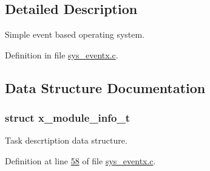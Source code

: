 \subsection{Detailed Description}
Simple event based operating system. 



Definition in file \hyperlink{a00037_source}{sys\+\_\+eventx.\+c}.



\subsection{Data Structure Documentation}
\label{dc/d0a/a00850}
\hypertarget{a00037_dc/d0a/a00850}{}
\subsubsection{struct x\+\_\+module\+\_\+info\+\_\+t}
Task descrtiption data structure. 

Definition at line \hyperlink{a00037_source_l00058}{58} of file \hyperlink{a00037_source}{sys\+\_\+eventx.\+c}.



